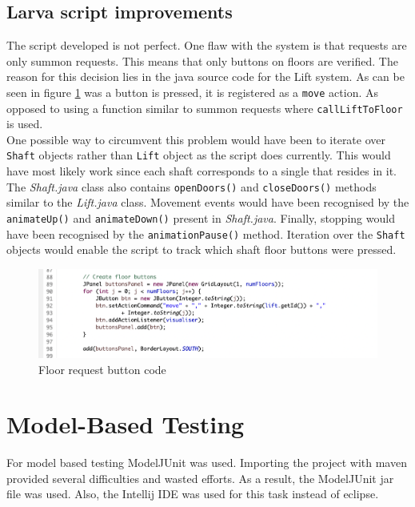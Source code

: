 \documentclass[a4paper, 12pt]{article}
\begin{document}
\subsection{Larva script improvements}
The script developed is not perfect. One flaw with the system is that requests are only summon requests. This means that only buttons on floors are verified. The reason for this decision lies in the java source code for the Lift system. As can be seen in figure \ref{fig:floor-request-code} was a button is pressed, it is registered as a \texttt{move} action. As opposed to using a function similar to summon requests where \texttt{callLiftToFloor} is used. \\

One possible way to circumvent this problem would have been to iterate over \texttt{Shaft} objects rather than \texttt{Lift} object as the script does currently. This would have most likely work since each shaft corresponds to a single that resides in it. The \textit{Shaft.java} class also contains \texttt{openDoors()} and \texttt{closeDoors()} methods similar to the \textit{Lift.java} class. Movement events would have been recognised by the \texttt{animateUp()} and \texttt{animateDown()} present in \textit{Shaft.java}. Finally, stopping would have been recognised by the \texttt{animationPause()} method. Iteration over the \texttt{Shaft} objects would enable the script to track which shaft floor buttons were pressed. 

\begin{figure}[h]
   \centering
   \includegraphics[width=\textwidth,height=\textheight,keepaspectratio]{images/floor-request-code} %
   \caption{Floor request button code}
   \label{fig:floor-request-code}
\end{figure}



\section{Model-Based Testing}
For model based testing ModelJUnit was used. Importing the project with maven provided several difficulties and wasted efforts. As a result, the ModelJUnit jar file was used. Also, the Intellij IDE was used for this task instead of eclipse. \\
\end{document}
